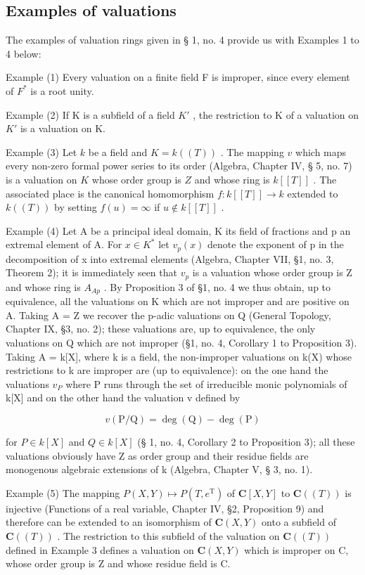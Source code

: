 \subsection{Examples of valuations}

The examples of valuation rings given in § 1, no. 4 provide us with Examples 1 to 4 below:

Example (1) Every valuation on a finite field F is improper, since every element of \(F^{*}\) is a root unity.

Example (2) If K is a subfield of a field \(K'\) , the restriction to K of a valuation on \(K'\) is a valuation on K.

Example (3) Let \(k\) be a field and \(K = k((T))\) . The mapping \(v\) which maps every non-zero formal power series to its order (Algebra, Chapter IV, § 5, no. 7) is a valuation on \(K\) whose order group is \(Z\) and whose ring is \(k[[T]]\) . The associated place is the canonical homomorphism \(f: k[[T]] \to k\) extended to \(k((T))\) by setting \(f(u) = \infty\) if \(u \notin k[[T]]\) .

Example (4) Let A be a principal ideal domain, K its field of fractions and p an extremal element of A. For \(x \in K^{*}\) let \(v_{p}(x)\) denote the exponent of p in the decomposition of x into extremal elements (Algebra, Chapter VII, §1, no. 3, Theorem 2); it is immediately seen that \(v_{p}\) is a valuation whose order group is Z and whose ring is \(A_{Ap}\) . By Proposition 3 of §1, no. 4 we thus obtain, up to equivalence, all the valuations on K which are not improper and are positive on A. Taking A = Z we recover the p-adic valuations on Q (General Topology, Chapter IX, §3, no. 2); these valuations are, up to equivalence, the only valuations on Q which are not improper (§1, no. 4, Corollary 1 to Proposition 3). Taking A = k{[}X{]}, where k is a field, the non-improper valuations on k(X) whose restrictions to k are improper are (up to equivalence): on the one hand the valuations \(v_{P}\) where P runs through the set of irreducible monic polynomials of k{[}X{]} and on the other hand the valuation v defined by

\[
v (\mathrm{P} / \mathrm{Q}) = \deg (\mathrm{Q}) - \deg (\mathrm{P})
\]

for \(P \in k[X]\) and \(Q \in k[X]\) (§ 1, no. 4, Corollary 2 to Proposition 3); all these valuations obviously have Z as order group and their residue fields are monogenous algebraic extensions of k (Algebra, Chapter V, § 3, no. 1).

Example (5) The mapping \(P(X, Y) \mapsto P(T, e^{\mathrm{T}})\) of \(\mathbf{C}[X, Y]\) to \(\mathbf{C}((T))\) is injective (Functions of a real variable, Chapter IV, §2, Proposition 9) and therefore can be extended to an isomorphism of \(\mathbf{C}(X, Y)\) onto a subfield of \(\mathbf{C}((T))\) . The restriction to this subfield of the valuation on \(\mathbf{C}((T))\) defined in Example 3 defines a valuation on \(\mathbf{C}(X, Y)\) which is improper on C, whose order group is Z and whose residue field is C.


